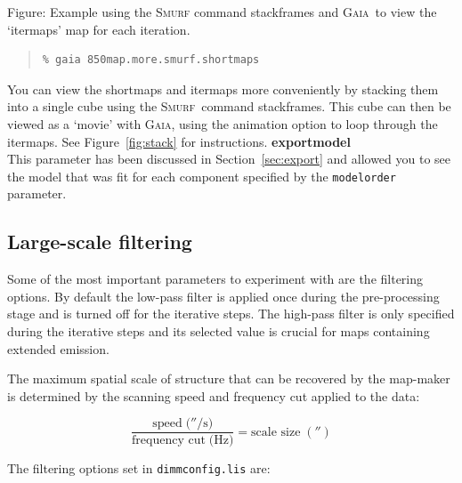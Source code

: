 \documentclass[twoside,11pt]{article}
\newcommand{\htmladdimg}[1]{}
\newcommand{\htmlref}[2]{#1}
\newcommand{\latexhtml}[2]{#1}
\newcommand{\xref}[3]{#1}
\newcommand{\xlabel}[1]{}
\renewcommand{\_}{\texttt{\symbol{95}}}
\newenvironment{myquote}{
   \color{MidnightBlue}\begin{quote}\begin{small}}{
   \end{small}\end{quote}
}
\newcommand{\gaia}{\xref{\textsc{Gaia}}{sun214}{}}
\newcommand{\smurf}{\xref{\textsc{Smurf}}{sun258}{}}
\newcommand{\task}[1]{\textsf{#1}}
\newcommand{\param}[1]{\texttt{#1}}
\newcommand{\file}[1]{\texttt{#1}}
\newcommand{\stackframes}{\xref{\task{stackframes}}{sun258}{STACKFRAMES}}
\newcommand{\cref}[3]{\latexhtml{#1~\ref{#2}}{\htmlref{#3}{#2}}}
\renewenvironment{myquote}{
      \begin{quote}\begin{small}}{
      \end{small}\end{quote}
   }
\begin{document}
\begin{htmlonly}
\label{fig:stack} \htmladdimg{sc21_view_itermaps.png}
Figure: Example using the \textsc{Smurf} command \task{stackframes} and
\gaia\ to view the `itermaps' map for each iteration.
\end{htmlonly}

\begin{myquote}
\begin{verbatim}
% gaia 850map.more.smurf.shortmaps
\end{verbatim}
\end{myquote}

You can view the shortmaps and itermaps more
conveniently by stacking them into a single cube using the \smurf\
command \stackframes. This cube can then be viewed as a
`movie' with \gaia, using the animation option to loop through the
itermaps. See \cref{Figure}{fig:stack}{the box above} for instructions.
\newline\newline
\textbf{exportmodel}\\
This parameter has been discussed in
\cref{Section}{sec:export}{Exporting individual models} and allowed
you to see the model that was fit for each component specified by the
\param{modelorder} parameter.

\subsection{\xlabel{filt}Large-scale filtering}
\label{sec:filt}

Some of the most important parameters to experiment with are the
filtering options. By default the low-pass filter is applied once
during the pre-processing stage and is turned off for the iterative
steps. The high-pass filter is only specified during the iterative
steps and its selected value is crucial for maps containing extended
emission.

The maximum spatial scale of structure that can be recovered by the
map-maker is determined by the scanning speed and frequency cut
applied to the data:

\begin{equation}
\frac{\mbox{speed}\;(''/\mbox{s)}}{\mbox{frequency cut}\;(\mbox{Hz)}}=\mbox{scale size}\;('')
\end{equation}

The filtering options set in \file{dimmconfig.lis} are:
\end{document}
